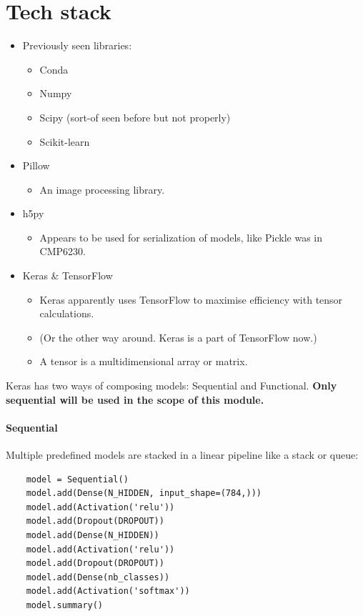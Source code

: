 \documentclass[12pt]{report}
\newcommand{\para}{\vspace{7pt}\noindent}
\begin{document}
\chapter*{Tech stack}
\begin{itemize}
    \item Previously seen libraries:
    \begin{itemize}
        \item Conda 
        \item Numpy
        \item Scipy (sort-of seen before but not properly)
        \item Scikit-learn 
    \end{itemize}
    \item Pillow
    \begin{itemize}
        \item An image processing library.
    \end{itemize}
    \item h5py
    \begin{itemize}
        \item Appears to be used for serialization of models, like Pickle was in CMP6230.
    \end{itemize}
    \item Keras \& TensorFlow
    \begin{itemize}
        \item Keras apparently uses TensorFlow to maximise efficiency with tensor calculations.
        \item (Or the other way around. Keras is a part of TensorFlow now.)
        \item A tensor is a multidimensional array or matrix.
    \end{itemize}
\end{itemize}

\para Keras has two ways of composing models: Sequential and Functional. \textbf{Only sequential will be 
used in the scope of this module.} 
\vspace{8pt}
\subsubsection{Sequential}
Multiple predefined models are stacked in a linear pipeline like a stack or queue:

\begin{verbatim}
    model = Sequential()
    model.add(Dense(N_HIDDEN, input_shape=(784,)))
    model.add(Activation('relu'))
    model.add(Dropout(DROPOUT))
    model.add(Dense(N_HIDDEN))
    model.add(Activation('relu'))
    model.add(Dropout(DROPOUT))
    model.add(Dense(nb_classes))
    model.add(Activation('softmax'))
    model.summary()
\end{verbatim}
\end{document}
